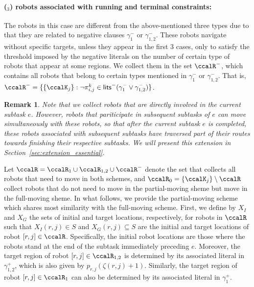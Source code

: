 \documentclass[Afour,sageh,times]{sagej}
\newtheorem{rem}[thm]{Remark}
\newcounter{mycounter}
\renewcommand{\ap}[3]{\mathcal{\pi}_{{#1},{#2}}^{#3}}
\begin{document}
{{ \paragraph{($_3$) robots associated with running and terminal constraints:}\label{sec:essential_c} The robots in this case  are different from the above-mentioned three types due to that they are related to negative clauses $\gamma_1^-$ or $\gamma_{1,2}^-$. These robots navigate without specific targets, unless they appear in the first 3 cases, only to satisfy the threshold imposed by the negative literals on the number of certain type of robots that appear at some regions. We collect them in the set $\ccalR^-$, which contains all robots that belong to certain types mentioned in $\gamma_1^-$ or $\gamma_{1,2}^-$. That is, $\ccalR^- = \{\{\ccalK_j\}: \neg \ap{i}{j}{k} \in \mathsf{lits}^- (\gamma_1^-  \vee \gamma_{1,2}^-) \}$.

 \begin{rem}
   Note that we collect robots that are directly involved in the current subtask $e$. However, robots that pariticipate in subsequent subtasks of $e$ can move simultaneously with these robots, so that after the current subtask $e$ is completed, these robots associated with subsequent subtasks have traversed part of their routes towards finishing their respective subtasks. We will present this extension in Section~\ref{sec:extension_essential}.
 \end{rem}

Let $\ccalR = \ccalR_1 \cup\ccalR_{1,2}  \cup \ccalR^-$ denote the set that collects all robots that need to move in both schemes, and $\ccalR_0 = \{\ccalK_j\}\setminus\ccalR$ collect robots that do not need to move in the partial-moving sheme but move in the full-moving sheme. In what follows, we provide the partial-moving scheme which shares most similarity with the full-moving scheme. First, we define by $X_I$ and $X_G$ the sets of initial and target locations, respectively, for robots in $\ccalR$  such that $X_I(r,j) \in S$ and $X_G(r,j)\subseteq S$ are the initial  and target locations of robot $[r,j] \in \ccalR$. Specifically, the initial robot locations are those where the robots stand at the end of the subtask immediately preceding $e$. Moreover, the target region of  robot $[r,j] \in \ccalR_{1,2}$ is determined  by its associated literal in $\gamma_{1,2}^+$, which is also given by  $p_{r,j}(\zeta(r,j)+1)$. Similarly, the target region of robot $[r,j] \in \ccalR_{1}$ can also be determined by its associated literal in $\gamma_1^+$. %

}}
\end{document}
